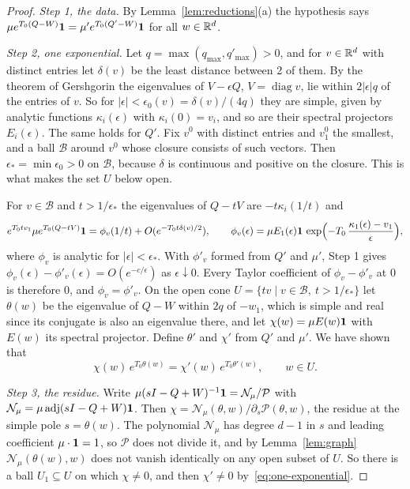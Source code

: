 \begin{proof}
\emph{Step 1, the data.} By Lemma~\ref{lem:reductions}(a) the hypothesis says
$\mu e^{T_0(Q-W)}\mathbf{1}=\mu'e^{T_0(Q'-W)}\mathbf{1}$ for all $w\in\mathbb{R}^d$.

\emph{Step 2, one exponential.} Let $q=\max(q_{\max},q'_{\max})>0$, and for $v\in\mathbb{R}^d$ with
distinct entries let $\delta(v)$ be the least distance between 2 of them. By the theorem of
Gershgorin the eigenvalues of $V-\epsilon Q$, $V=\operatorname{diag}v$, lie within $2|\epsilon|q$
of the entries of $v$. So for $|\epsilon|<\epsilon_0(v)=\delta(v)/(4q)$ they are simple, given by
analytic functions $\kappa_i(\epsilon)$ with $\kappa_i(0)=v_i$, and so are their spectral
projectors $E_i(\epsilon)$. The same holds for $Q'$. Fix $v^0$ with distinct entries and $v^0_1$
the smallest, and a ball $\mathcal B$ around $v^0$ whose closure consists of such vectors. Then
$\epsilon_*=\min\epsilon_0>0$ on $\mathcal B$, because $\delta$ is continuous and positive on the
closure. This is what makes the set $U$ below open.

For $v\in\mathcal B$ and $t>1/\epsilon_*$ the eigenvalues of $Q-tV$ are $-t\kappa_i(1/t)$ and
\[
 e^{T_0tv_1}\mu e^{T_0(Q-tV)}\mathbf{1}=\phi_v(1/t)+O(e^{-T_0t\delta(v)/2}),\qquad
 \phi_v(\epsilon)=\mu E_1(\epsilon)\mathbf{1}\,\exp\Bigl(-T_0\,\frac{\kappa_1(\epsilon)-v_1}{\epsilon}\Bigr),
\]
where $\phi_v$ is analytic for $|\epsilon|<\epsilon_*$. With $\phi'_v$ formed from $Q'$ and
$\mu'$, Step 1 gives $\phi_v(\epsilon)-\phi'_v(\epsilon)=O(e^{-c/\epsilon})$ as $\epsilon\downarrow0$.
Every Taylor coefficient of $\phi_v-\phi'_v$ at $0$ is therefore $0$, and $\phi_v=\phi'_v$. On the
open cone $U=\{tv\mid v\in\mathcal B,\ t>1/\epsilon_*\}$ let $\theta(w)$ be the eigenvalue of $Q-W$
within $2q$ of $-w_1$, which is simple and real since its conjugate is also an eigenvalue there,
and let $\chi(w)=\mu E(w)\mathbf{1}$ with $E(w)$ its spectral projector. Define $\theta'$ and $\chi'$
from $Q'$ and $\mu'$. We have shown that
\begin{equation}\label{eq:one-exponential}
 \chi(w)\,e^{T_0\theta(w)}=\chi'(w)\,e^{T_0\theta'(w)},\qquad w\in U .
\end{equation}

\emph{Step 3, the residue.} Write $\mu(sI-Q+W)^{-1}\mathbf{1}=\mathcal N_\mu/\mathcal P$ with
$\mathcal N_\mu=\mu\operatorname{adj}(sI-Q+W)\mathbf{1}$. Then
$\chi=\mathcal N_\mu(\theta,w)/\partial_s\mathcal P(\theta,w)$, the residue at the simple pole
$s=\theta(w)$. The polynomial $\mathcal N_\mu$ has degree $d-1$ in $s$ and leading coefficient
$\mu\cdot\mathbf{1}=1$, so $\mathcal P$ does not divide it, and by Lemma~\ref{lem:graph}
$\mathcal N_\mu(\theta(w),w)$ does not vanish identically on any open subset of $U$. So there is a
ball $U_1\subseteq U$ on which $\chi\ne0$, and then $\chi'\ne0$ by~\eqref{eq:one-exponential}.


\end{proof}
